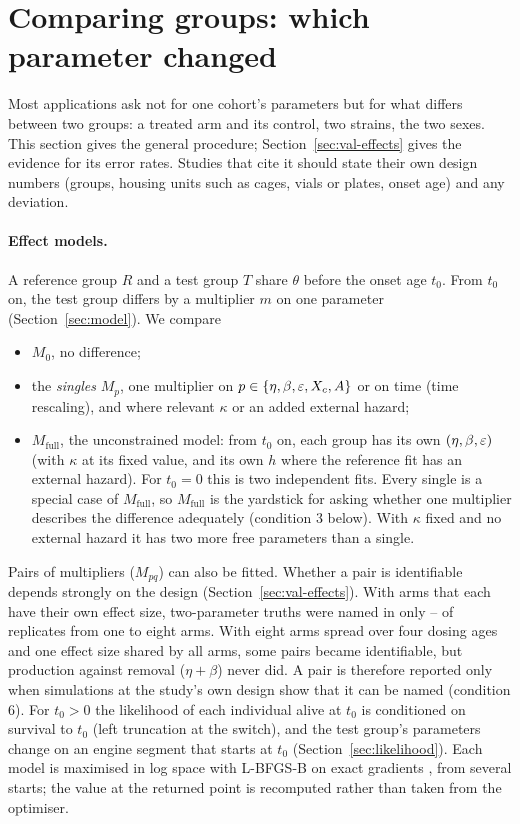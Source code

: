 \section{Comparing groups: which parameter changed}\label{sec:effects}

Most applications ask not for one cohort's parameters but for what differs between two groups: a treated arm and its
control, two strains, the two sexes. This section gives the general procedure; Section~\ref{sec:val-effects} gives
the evidence for its error rates. Studies that cite it should state their own design numbers (groups, housing units such as cages, vials or plates,
onset age) and any deviation.

\paragraph{Effect models.} A reference group $R$ and a test group $T$ share $\theta$ before the onset age $t_0$. From
$t_0$ on, the test group differs by a multiplier $m$ on one parameter (Section~\ref{sec:model}). We compare
\begin{itemize}[leftmargin=1.5em,itemsep=1pt]
  \item $M_0$, no difference;
  \item the \emph{singles} $M_p$, one multiplier on $p\in\{\eta,\beta,\varepsilon,X_c,A\}$ or on time (time rescaling), and
    where relevant $\kappa$ or an added external hazard;
  \item $M_\text{full}$, the unconstrained model: from $t_0$ on, each group has its own $(\eta,\beta,\varepsilon)$ (with $\kappa$ at
    its fixed value, and its own $h$ where the reference fit has an external hazard). For $t_0=0$ this is two independent
    fits. Every single is a special case of $M_\text{full}$, so $M_\text{full}$ is the yardstick for asking whether one
    multiplier describes the difference adequately (condition 3 below). With $\kappa$ fixed and no external hazard it
    has two more free parameters than a single.
\end{itemize}
Pairs of multipliers ($M_{pq}$) can also be fitted. Whether a pair is identifiable depends strongly on the design
(Section~\ref{sec:val-effects}). With arms that each have their own effect size, two-parameter truths were named in only
-- of replicates from one to eight arms. With eight arms spread over four dosing
ages and one effect size shared by all arms, some pairs became identifiable, but production against removal
($\eta+\beta$) never did. A pair is therefore reported only when simulations at the study's own design show that it
can be named (condition 6). For $t_0>0$ the likelihood of each individual alive at $t_0$ is conditioned on survival to $t_0$
(left truncation at the switch), and the test group's parameters change on an engine segment that starts at $t_0$
(Section~\ref{sec:likelihood}). Each model is maximised in log space with L-BFGS-B on exact gradients
\citep{byrd1995limited}, from several starts; the value at the returned point is recomputed rather than taken from
the optimiser.

